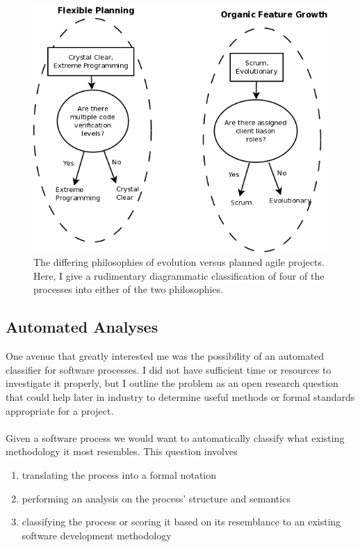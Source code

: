 \begin{figure}[ht!]
  \centering
  \includegraphics[scale=0.4]{media/DecisionTreeAgilers}
  \caption{The differing philosophies of evolution versus planned agile projects.
  Here, I give a rudimentary diagrammatic classification of four of the
  processes into either of the two philosophies.}
  \label{DecTreeAgilers}
\end{figure}

\pagebreak

\subsection{Automated Analyses}
One avenue that greatly interested me was the possibility of an automated
classifier for software processes.
I did not have sufficient time or resources to investigate it properly, but I
outline the problem as an open research question that could help later in
industry to determine useful methods or formal standards appropriate for a
project.\\
\\
Given a software process we would want to automatically classify what existing
methodology it most resembles.
This question involves
\begin{enumerate}
  \item translating the process into a formal notation
  \item performing an analysis on the process' structure and semantics
  \item classifying the process or scoring it based on its resemblance to an existing software
  development methodology
\end{enumerate}

